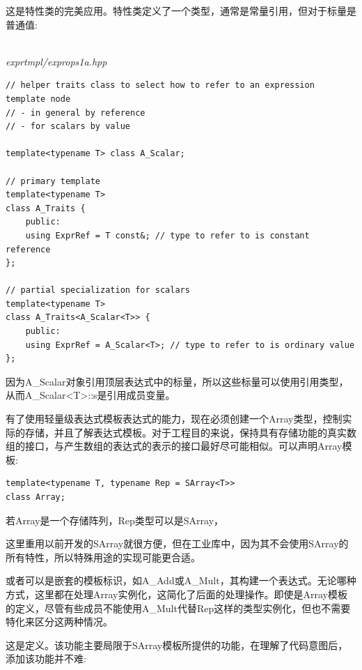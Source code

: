 这是特性类的完美应用。特性类定义了一个类型，通常是常量引用，但对于标量是普通值:

\hspace*{\fill} \\ %
\noindent
\textit{exprtmpl/exprops1a.hpp}
\begin{lstlisting}[style=styleCXX]
// helper traits class to select how to refer to an expression template node
// - in general by reference
// - for scalars by value

template<typename T> class A_Scalar;

// primary template
template<typename T>
class A_Traits {
	public:
	using ExprRef = T const&; // type to refer to is constant reference
};

// partial specialization for scalars
template<typename T>
class A_Traits<A_Scalar<T>> {
	public:
	using ExprRef = A_Scalar<T>; // type to refer to is ordinary value
};
\end{lstlisting}

因为A\_Scalar对象引用顶层表达式中的标量，所以这些标量可以使用引用类型，从而A\_Scalar<T>::s是引用成员变量。


有了使用轻量级表达式模板表达式的能力，现在必须创建一个Array类型，控制实际的存储，并且了解表达式模板。对于工程目的来说，保持具有存储功能的真实数组的接口，与产生数组的表达式的表示的接口最好尽可能相似。可以声明Array模板:

\begin{lstlisting}[style=styleCXX]
template<typename T, typename Rep = SArray<T>>
class Array;
\end{lstlisting}

若Array是一个存储阵列，Rep类型可以是SArray，

\begin{tcolorbox}[colback=webgreen!5!white,colframe=webgreen!75!black]
\hspace*{0.75cm}这里重用以前开发的SArray就很方便，但在工业库中，因为其不会使用SArray的所有特性，所以特殊用途的实现可能更合适。
\end{tcolorbox}

或者可以是嵌套的模板标识，如A\_Add或A\_Mult，其构建一个表达式。无论哪种方式，这里都在处理Array实例化，这简化了后面的处理操作。即使是Array模板的定义，尽管有些成员不能使用A\_Mult代替Rep这样的类型实例化，但也不需要特化来区分这两种情况。

这是定义。该功能主要局限于SArray模板所提供的功能，在理解了代码意图后，添加该功能并不难:

